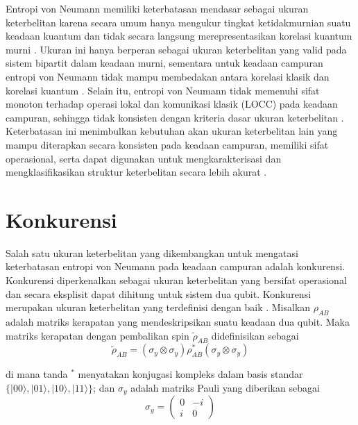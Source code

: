 \par
Entropi von Neumann memiliki keterbatasan mendasar sebagai ukuran keterbelitan karena secara umum hanya mengukur tingkat ketidakmurnian suatu keadaan kuantum dan tidak secara langsung merepresentasikan korelasi kuantum murni \cite{horodecki2009quantum,Plenio2007}. Ukuran ini hanya berperan sebagai ukuran keterbelitan yang valid pada sistem bipartit dalam keadaan murni, sementara untuk keadaan campuran entropi von Neumann tidak mampu membedakan antara korelasi klasik dan korelasi kuantum \cite{nielsen2010quantum}. Selain itu, entropi von Neumann tidak memenuhi sifat monoton terhadap operasi lokal dan komunikasi klasik (LOCC) pada keadaan campuran, sehingga tidak konsisten dengan kriteria dasar ukuran keterbelitan \cite{Vedral1997}. Keterbatasan ini menimbulkan kebutuhan akan ukuran keterbelitan lain yang mampu diterapkan secara konsisten pada keadaan campuran, memiliki sifat operasional, serta dapat digunakan untuk mengkarakterisasi dan mengklasifikasikan struktur keterbelitan secara lebih akurat \cite{Wootters1998}.


\section{Konkurensi}
\par
Salah satu ukuran keterbelitan yang dikembangkan untuk mengatasi keterbatasan entropi von Neumann pada keadaan campuran adalah konkurensi. Konkurensi diperkenalkan sebagai ukuran keterbelitan yang bersifat operasional dan secara eksplisit dapat dihitung untuk sistem dua qubit. Konkurensi merupakan ukuran keterbelitan yang terdefinisi dengan baik \cite{Wootters1998}. Misalkan $\rho_{AB}$ adalah matriks kerapatan yang mendeskripsikan suatu keadaan dua qubit. Maka matriks kerapatan dengan pembalikan spin $\tilde{\rho}_{AB}$ didefinisikan sebagai
\begin{equation}
	\tilde{\rho}_{AB} = (\sigma_y \otimes \sigma_y)\rho_{AB}^*(\sigma_y \otimes \sigma_y)
\end{equation}

di mana tanda $^*$ menyatakan konjugasi kompleks dalam basis standar $\{|00\rangle, |01\rangle, |10\rangle, |11\rangle\}$; dan $\sigma_y$ adalah matriks Pauli yang diberikan sebagai
\begin{equation}
	\sigma_y =
	\begin{pmatrix}
		0 & -i \\
		i & 0
	\end{pmatrix}
\end{equation}

